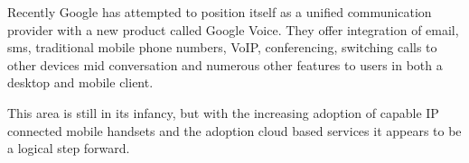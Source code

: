 Recently Google has attempted to position itself as a unified communication provider with a new product called Google Voice. They offer integration of email, sms, traditional mobile phone numbers, VoIP, conferencing, switching calls to other devices mid conversation and numerous other features to users in both a desktop and mobile client.

This area is still in its infancy, but with the increasing adoption of capable IP connected mobile handsets and the adoption cloud based services it appears to be a logical step forward.


